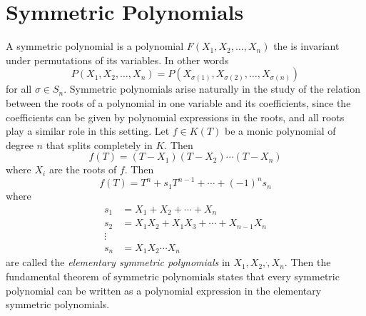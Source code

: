 \documentclass{article}
\theoremstyle{plain}
\theoremstyle{remark}
\begin{document}
    \section{Symmetric Polynomials}
    A symmetric polynomial is a polynomial $F(X_1,X_2,\dots, X_n)$ the is invariant under permutations of its variables.
    In other words
    $$ P(X_1, X_2,\dots, X_n)=P(X_{\sigma(1)}, X_{\sigma(2)},\dots,X_{\sigma(n)})$$
    for all $\sigma\in S_n$.
    Symmetric polynomials arise naturally in the study of the relation between the roots of a polynomial in one variable and its coefficients, 
    since the coefficients can be given by polynomial expressions in the roots, and all roots play a similar role in this setting.
    Let $f\in K(T)$ be a monic polynomial of degree $n$ that splits completely in $K$.
    Then
    $$ f(T)=(T-X_1)(T-X_2)\cdots(T-X_n)$$
    where $X_i$ are the roots of $f$. Then
    $$ f(T)=T^n+s_1 T^{n-1}+\cdots+(-1)^n s_n$$
    where
    \begin{align*}
        s_1&=X_1+X_2+\cdots+X_n\\
        s_2&=X_1X_2+X_1X_3+\cdots+X_{n-1}X_n\\
        \vdots&\\
        s_n&=X_1X_2\cdots X_n
    \end{align*}
    are called the \textit{elementary symmetric polynomials} in $X_1,X_2,\dot, X_n$.
    Then the fundamental theorem of symmetric polynomials states that every symmetric polynomial can be written as a polynomial expression in the elementary symmetric polynomials.
\end{document}
